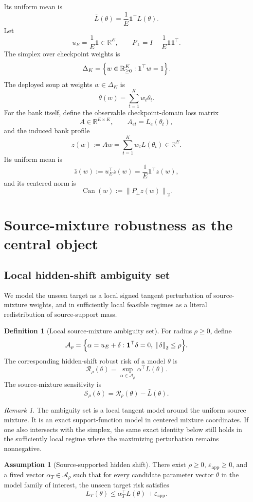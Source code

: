 \documentclass[11pt]{article}
\newcommand{\R}{\mathbb{R}}
\newcommand{\1}{\mathbf{1}}
\newcommand{\norm}[1]{\left\lVert #1 \right\rVert}
\newcommand{\ubar}{u_E}
\newcommand{\Aset}{\mathcal{A}_\rho}
\newcommand{\Dset}{\Delta_K}
\newcommand{\Pperp}{P_\perp}
\theoremstyle{plain}
\theoremstyle{definition}
\newtheorem{definition}[theorem]{Definition}
\newtheorem{assumption}[theorem]{Assumption}
\theoremstyle{remark}
\newtheorem{remark}[theorem]{Remark}
\begin{document}
Its uniform mean is
\[
\bar L(\theta) = \frac{1}{E}\1^\top L(\theta).
\]
Let
\[
\ubar = \frac{1}{E}\1 \in \R^E, \qquad \Pperp = I - \frac{1}{E}\1\1^\top.
\]
The simplex over checkpoint weights is
\[
\Dset = \Bigl\{w \in \R^K_{\ge 0} : \1^\top w = 1\Bigr\}.
\]
The deployed soup at weights $w \in \Dset$ is
\[
\bar\theta(w) = \sum_{t=1}^K w_t \theta_t.
\]
For the bank itself, define the observable checkpoint-domain loss matrix
\[
A \in \R^{E \times K}, \qquad A_{e t} = L_e(\theta_t),
\]
and the induced bank profile
\[
z(w) := Aw = \sum_{t=1}^K w_t L(\theta_t) \in \R^E.
\]
Its uniform mean is
\[
\bar z(w) := \ubar^\top z(w) = \frac{1}{E}\1^\top z(w),
\]
and its centered norm is
\[
\operatorname{Can}(w) := \norm{\Pperp z(w)}_2.
\]

\section{Source-mixture robustness as the central object}
\subsection{Local hidden-shift ambiguity set}
We model the unseen target as a local signed tangent perturbation of source-mixture weights, and in sufficiently local feasible regimes as a literal redistribution of source-support mass.

\begin{definition}[Local source-mixture ambiguity set]
For radius $\rho \ge 0$, define
\[
\Aset = \Bigl\{\alpha = \ubar + \delta : \1^\top \delta = 0,\; \norm{\delta}_2 \le \rho\Bigr\}.
\]
The corresponding hidden-shift robust risk of a model $\theta$ is
\[
\mathcal{R}_{\rho}(\theta) = \sup_{\alpha \in \Aset} \alpha^\top L(\theta).
\]
The source-mixture sensitivity is
\[
\mathcal{S}_{\rho}(\theta) = \mathcal{R}_{\rho}(\theta) - \bar L(\theta).
\]
\end{definition}

\begin{remark}
The ambiguity set is a local tangent model around the uniform source mixture. It is an exact support-function model in centered mixture coordinates. If one also intersects with the simplex, the same exact identity below still holds in the sufficiently local regime where the maximizing perturbation remains nonnegative.
\end{remark}

\begin{assumption}[Source-supported hidden shift]\label{ass:hidden_shift}
There exist $\rho \ge 0$, $\varepsilon_{\mathrm{app}} \ge 0$, and a fixed vector $\alpha_T \in \Aset$ such that for every candidate parameter vector $\theta$ in the model family of interest, the unseen target risk satisfies
\[
L_T(\theta) \le \alpha_T^\top L(\theta) + \varepsilon_{\mathrm{app}}.
\]
\end{assumption}
\end{document}
